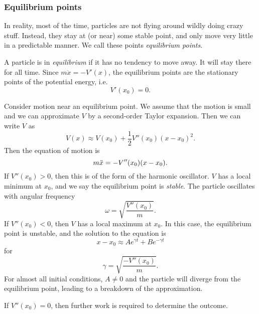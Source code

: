 \documentclass[a4paper]{article}
\begin{document}
\subsubsection*{Equilibrium points}
In reality, most of the time, particles are not flying around wildly doing crazy stuff. Instead, they stay at (or near) some stable point, and only move very little in a predictable manner. We call these points \emph{equilibrium points}.

\begin{defi}
  A particle is in \emph{equilibrium} if it has no tendency to move away. It will stay there for all time. Since $m\ddot{x} = -V'(x)$, the equilibrium points are the stationary points of the potential energy, i.e.
  \[
    V'(x_0) = 0.
  \]
\end{defi}
Consider motion near an equilibrium point. We assume that the motion is small and we can approximate $V$ by a second-order Taylor expansion. Then we can write $V$ as
\[
  V(x) \approx V(x_0) + \frac{1}{2}V''(x_0)(x - x_0)^2.
\]
Then the equation of motion is
\[
  m\ddot{x} = -V''(x_0)(x - x_0).\\
\]
If $V''(x_0) > 0$, then this is of the form of the harmonic oscillator. $V$ has a local minimum at $x_0$, and we say the equilibrium point is \emph{stable}. The particle oscillates with angular frequency
\[
  \omega = \sqrt{\frac{V''(x_0)}{m}}.
\]
If $V''(x_0) < 0$, then $V$ has a local maximum at $x_0$. In this case, the equilibrium point is unstable, and the solution to the equation is
\[
  x - x_0 \approx Ae^{\gamma t} + Be^{-\gamma t}
\]
for
\[
  \gamma = \sqrt{\frac{-V''(x_0)}{m}}.
\]
For almost all initial conditions, $A \not= 0$ and the particle will diverge from the equilibrium point, leading to a breakdown of the approximation.

If $V''(x_0) = 0$, then further work is required to determine the outcome.
\end{document}
